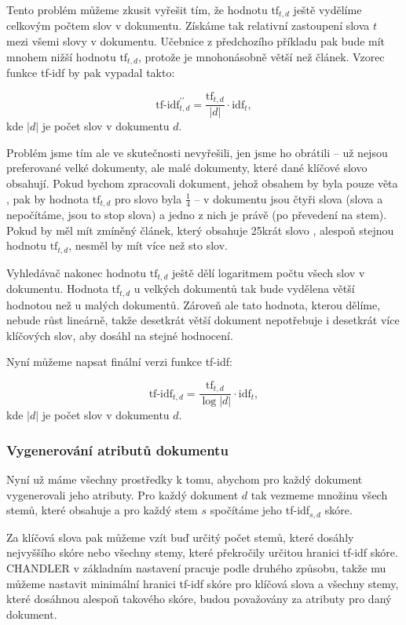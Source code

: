 \documentclass[12pt]{article}
\newcommand{\name}{CHANDLER}
\newcommand{\sssection}[1]{\subsubsection{#1}}
\begin{document}
Tento problém můžeme zkusit vyřešit tím, že hodnotu $\mbox{tf}_{t,d}$ ještě vydělíme celkovým počtem slov v dokumentu. Získáme tak relativní zastoupení slova $t$ mezi všemi slovy v dokumentu. Učebnice z předchozího příkladu pak bude mít mnohem nižší hodnotu $\mbox{tf}_{t,d}$, protože je mnohonásobně větší než článek. Vzorec funkce tf-idf by pak vypadal takto:

$$
\mbox{tf-idf}_{t,d}^{\prime\prime} = \frac{\mbox{tf}_{t,d}}{|d|}\cdot\mbox{idf}_t,
$$
kde $|d|$ je počet slov v dokumentu $d$.

Problém jsme tím ale ve skutečnosti nevyřešili, jen jsme ho obrátili -- už nejsou preferované velké dokumenty, ale malé dokumenty, které dané klíčové slovo obsahují. Pokud bychom zpracovali dokument, jehož obsahem by byla pouze věta , pak by hodnota $\mbox{tf}_{t,d}$ pro slovo  byla $\frac14$ -- v dokumentu jsou čtyři slova (slova  a  nepočítáme, jsou to stop slova) a jedno z nich je právě  (po převedení na stem). Pokud by měl mít zmíněný článek, který obsahuje 25krát slovo , alespoň stejnou hodnotu $\mbox{tf}_{t,d}$, nesměl by mít více než sto slov. 

Vyhledávač nakonec hodnotu $\mbox{tf}_{t,d}$ ještě dělí logaritmem počtu všech slov v dokumentu. Hodnota $\mbox{tf}_{t,d}$ u velkých dokumentů tak bude vydělena větší hodnotou než u malých dokumentů. Zároveň ale tato hodnota, kterou dělíme, nebude růst lineárně, takže desetkrát větší dokument nepotřebuje i desetkrát více klíčových slov, aby dosáhl na stejné hodnocení.

Nyní můžeme napsat finální verzi funkce tf-idf:

$$
\mbox{tf-idf}_{t,d} = \frac{\mbox{tf}_{t,d}}{\log |d|}\cdot\mbox{idf}_t,
$$
kde $|d|$ je počet slov v dokumentu $d$.

\sssection{Vygenerování atributů dokumentu}

Nyní už máme všechny prostředky k tomu, abychom pro každý dokument vygenerovali jeho atributy. Pro každý dokument $d$ tak vezmeme množinu všech stemů, které obsahuje a pro každý stem $s$ spočítáme jeho tf-idf$_{s,d}$ skóre. 

Za klíčová slova pak můžeme vzít buď určitý počet stemů, které dosáhly nejvyššího skóre nebo všechny stemy, které překročily určitou hranici tf-idf skóre. \name{} v základním nastavení pracuje podle druhého způsobu, takže mu můžeme nastavit minimální hranici tf-idf skóre pro klíčová slova a všechny stemy, které dosáhnou alespoň takového skóre, budou považovány za atributy pro daný dokument. 
\end{document}
